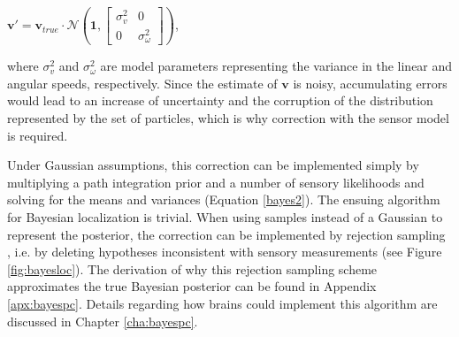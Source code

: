$\bm v' = \bm v_{true} \cdot \mathcal{N}(\bm 1, \begin{bmatrix}\sigma_v^2 & 0\\ 0 & \sigma_\omega^2\end{bmatrix}) $,

\noindent where $ \sigma_v^2 $ and $ \sigma_\omega^2 $ are model parameters representing the variance in the linear and angular speeds, respectively. Since the estimate of $\bm v$ is noisy, accumulating errors would lead to an increase of uncertainty and the corruption of the distribution represented by the set of particles, which is why correction with the sensor model is required. 

Under Gaussian assumptions, this correction can be implemented simply by multiplying a path integration prior and a number of sensory likelihoods and solving for the means and variances (Equation \ref{bayes2}). The ensuing algorithm for Bayesian localization is trivial. When using samples instead of a Gaussian to represent the posterior, the correction can be implemented by rejection sampling \citep{doucet2000sequential}, i.e. by deleting hypotheses inconsistent with sensory measurements (see Figure \ref{fig:bayesloc}). The derivation of why this rejection sampling scheme approximates the true Bayesian posterior can be found in Appendix \ref{apx:bayespc}. Details regarding how brains could implement this algorithm are discussed in Chapter \ref{cha:bayespc}.

